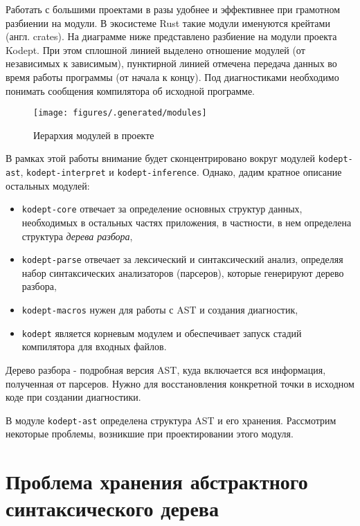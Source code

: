 Работать с большими проектами в разы удобнее и эффективнее при грамотном разбиении на модули.
В экосистеме Rust такие модули именуются крейтами (англ. crates).
На диаграмме ниже представлено разбиение на модули проекта Kodept.
При этом сплошной линией выделено отношение модулей (от независимых к зависимым), пунктирной линией отмечена передача данных во время работы программы (от начала к концу).
Под диагностиками необходимо понимать сообщения компилятора об исходной программе.

\begin{figure}[H]
    \centering
    \texttt{[image: figures/.generated/modules]}
    \caption{Иерархия модулей в проекте}
    \label{fig:modules}
\end{figure}

В рамках этой работы внимание будет сконцентрировано вокруг модулей \lstinline{kodept-ast}, \lstinline{kodept-interpret} и \lstinline{kodept-inference}.
Однако, дадим кратное описание остальных модулей:
\begin{itemize}
    \item \lstinline{kodept-core} отвечает за определение основных структур данных, необходимых в остальных частях приложения, в частности, в нем определена структура \textit{дерева разбора},
    \item \lstinline{kodept-parse} отвечает за лексический и синтаксический анализ, определяя набор синтаксических анализаторов (парсеров), которые генерируют дерево разбора,
    \item \lstinline{kodept-macros} нужен для работы с AST и создания диагностик,
    \item \lstinline{kodept} является корневым модулем и обеспечивает запуск стадий компилятора для входных файлов.
\end{itemize}

Дерево разбора - подробная версия AST, куда включается вся информация, полученная от парсеров.
Нужно для восстановления конкретной точки в исходном коде при создании диагностики.

В модуле \lstinline{kodept-ast} определена структура AST и его хранения.
Рассмотрим некоторые проблемы, возникшие при проектировании этого модуля.

\section{Проблема хранения абстрактного синтаксического дерева}
\label{sec:ast_structure}


